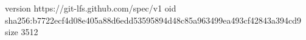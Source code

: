 version https://git-lfs.github.com/spec/v1
oid sha256:b7722ecf4d08e405a88d6edd53595894d48c85a963499ea493cf42843a394cd9
size 3512
